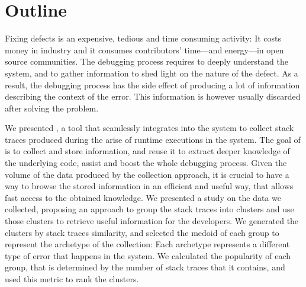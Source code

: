 %
%



\section{Outline}\label{sec:stacktraces-summary}

Fixing defects is an expensive, tedious and time consuming activity: It costs money in industry and it consumes contributors' time---and energy---in open source communities.
The debugging process requires to deeply understand the system, and to gather information to shed light on the nature of the defect.
As a result, the debugging process has the side effect of producing a lot of information describing the context of the error.
This information is however usually discarded after solving the problem.



We presented \slr, a tool that seamlessly integrates into the \pha system to collect stack traces produced during the arise of runtime executions in the system.
The goal of \slr is to collect and store information, and reuse it to extract deeper knowledge of the underlying code, assist and boost the whole debugging process.
Given the volume of the data produced by the collection approach, it is crucial to have a way to browse the stored information in an efficient and useful way, that allows fast access to the obtained knowledge.
We presented a study on the data we collected, proposing an approach to group the stack traces into clusters and use those clusters to retrieve useful information for the developers.
We generated the clusters by stack traces similarity, and selected the medoid of each group to represent the archetype of the collection: Each archetype represents a different type of error that happens in the system.
We calculated the popularity of each group, that is determined by the number of stack traces that it contains, and used this metric to rank the clusters.

